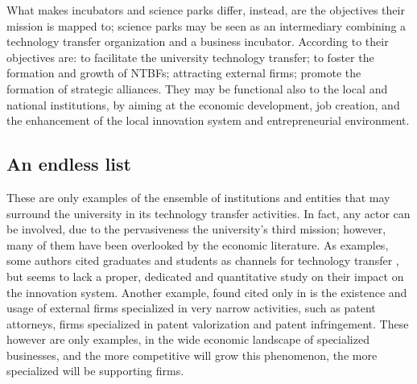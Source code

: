 What makes incubators and science parks differ, instead, are the objectives their mission is mapped to; science parks may be seen as an intermediary combining a technology transfer organization and a business incubator. According to \citet{Siegel2003} their objectives are: to facilitate the university technology transfer; to foster the formation and growth of NTBFs; attracting external firms; promote the formation of strategic alliances. They may be functional also to the local and national institutions, by aiming at the economic development, job creation, and the enhancement of the local innovation system and entrepreneurial environment. 

\subsection{An endless list}

These are only examples of the ensemble of institutions and entities that may surround the university in its technology transfer activities. In fact, any actor can be involved, due to the pervasiveness the university's third mission; however, many of them have been overlooked by the economic literature. As examples, some authors cited graduates and students as channels for technology transfer \citep{Segal1986, Audretsch2004,OShea2005,Guerrero2014}, but seems to lack a proper, dedicated and quantitative study on their impact on the innovation system. Another example, found cited only in \citet{Balderi2010} is the existence and usage of external firms specialized in very narrow activities, such as patent attorneys, firms specialized in patent valorization and patent infringement. These however are only examples, in the wide economic landscape of specialized businesses, and the more competitive will grow this phenomenon, the more specialized will be supporting firms. 
